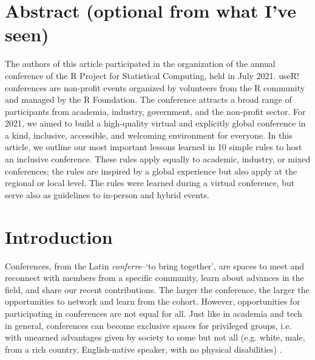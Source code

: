 \documentclass[10pt,letterpaper]{article}
\begin{document}
\section*{Abstract (optional from what I've seen)}

The authors of this article participated in the organization of the annual conference of the R Project for Statistical Computing, held in July 2021. useR! conferences are non-profit events organized by volunteers from the R community and managed by the R Foundation. The conference attracts a broad range of participants from academia, industry, government, and the non-profit sector. For 2021, we aimed to build a high-quality virtual and explicitly global conference in a kind, inclusive, accessible, and welcoming environment for everyone. 
In this article, we outline our most important lessons learned in 10 simple rules to host an inclusive conference. These rules apply equally to academic, industry, or mixed conferences; the rules are inspired by a global experience but also apply at the regional or local level. The rules were learned during a virtual conference, but serve also as guidelines to in-person and hybrid events. 


\linenumbers

\section*{Introduction}

Conferences, from the Latin \textit{conferre}--`to bring together', are spaces to meet and reconnect with members from a specific community, learn about advances in the field, and share our recent contributions.
The larger the conference, the larger the opportunities to network and learn from the cohort.
However, opportunities for participating in conferences are not equal for all. 
Just like in academia and tech in general, conferences can become exclusive spaces for privileged groups, i.e. with unearned advantages given by society to some but not all (e.g. white, male, from a rich country, English-native speaker, with no physical disabilities) \cite{arendDisparityConferenceRegistration2019, biggsAcademicConferenceChilly2018, depickerRethinkingInclusionDisability2020a, irishIncreasingParticipationUsing2020}.
\end{document}
